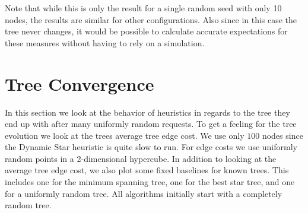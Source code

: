 \documentclass[a4paper, oneside]{discothesis}
\begin{document}
Note that while this is only the result for a single random seed with only 10 nodes, the results are similar for other configurations. Also since in this case the tree never changes, it would be possible to calculate accurate expectations for these measures without having to rely on a simulation.

\section{Tree Convergence}\label{result:convergence}

In this section we look at the behavior of heuristics in regards to the tree they end up with after many uniformly random requests. To get a feeling for the tree evolution we look at the trees average tree edge cost. We use only $100$ nodes since the Dynamic Star heuristic is quite slow to run. For edge costs we use uniformly random points in a 2-dimensional hypercube. In addition to looking at the average tree edge cost, we also plot some fixed baselines for known trees. This includes one for the minimum spanning tree, one for the best star tree, and one for a uniformly random tree. All algorithms initially start with a completely random tree.

\end{document}

